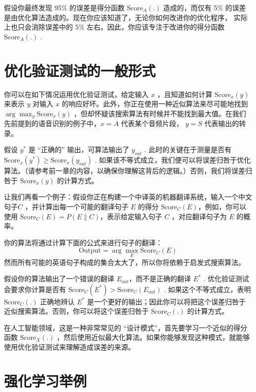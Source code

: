 假设你最终发现 95\% 的误差是得分函数 \(\text{Score}_A (.)\)
造成的，而仅有 5\%
的误差是由优化算法造成的。现在你应该知道了，无论你如何改进你的优化程序，
实际上也只会消除误差中的 5\% 左右。因此，你应该专注于改进你的得分函数
\(\text{Score}_A (.)\) .

\hypertarget{ux4f18ux5316ux9a8cux8bc1ux6d4bux8bd5ux7684ux4e00ux822cux5f62ux5f0f}{%
\chapter{优化验证测试的一般形式}\label{ux4f18ux5316ux9a8cux8bc1ux6d4bux8bd5ux7684ux4e00ux822cux5f62ux5f0f}}

你可以在如下情况运用优化验证测试，给定输入 \(x\) ，且知道如何计算
\(\text{Score}_x (y)\) 来表示 \(y\) 对输入 \(x\)
的响应好坏。此外，你正在使用一种近似算法来尽可能地找到\(\arg \max_y \text{Score}_x(y)\)
，但却怀疑该搜索算法有时候并不能找到最大值。在我们先前提到的语音识别的例子中，\(x=A\)
代表某个音频片段， \(y=S\) 代表输出的转录。

假设 \(y^*​\) 是 ``正确的'' 输出，可算法输出了 \(y_{out}​\) .
此时的关键在于测量是否有
\(\text{Score}_x(y^*) \ge \text{Score}_x(y_{out})​\) .
如果该不等式成立，我们便可以将误差归咎于优化算法。（请参考前一章的内容，以确保你理解这背后的逻辑。）否则，我们将误差归咎于
\(\text{Score}_x (y)​\) 的计算方式。

让我们再看一个例子：假设你正在构建一个中译英的机器翻译系统，输入一个中文句子\(C\)
，并计算出每一个可能的翻译句子 \(E\) 的得分
\(\text{Score}_C(E)\)，例如，你可以使用
\(\text{Score}_C(E)=P(E\|C)\)，表示给定输入句子 \(C\) ，对应翻译句子为
\(E\) 的概率。

你的算法将通过计算下面的公式来进行句子的翻译： \[
\text{Output}=\arg \max_E \text{Score}_C(E)
\]
然而所有可能的英语句子构成的集合太大了，所以你将依赖于启发式搜索算法。

假设你的算法输出了一个错误的翻译 \(E_{out}​\)，而不是正确的翻译 \(E^*​\) .
优化验证测试会要求你计算是否有
\(\text{Score}_C (E^*) \gt \text{Score}_C(E_{out}​)\) .
如果这个不等式成立，表明 \(\text{Score}_C(.)​\) 正确地辨认 \(E^*​\)
是一个更好的输出；因此你可以将把这个误差归咎于近似搜索算法。否则，你可以将这个误差归咎于
\(\text{Score}_C(.)​\) 的计算方式。

在人工智能领域，这是一种非常常见的
``设计模式''，首先要学习一个近似的得分函数 \(\text{Score}_X(.)\)
，然后使用近似最大化算法。如果你能够发现这种模式，就能够使用优化验证测试来理解造成误差的来源。

\hypertarget{ux5f3aux5316ux5b66ux4e60ux4e3eux4f8b}{%
\chapter{强化学习举例}\label{ux5f3aux5316ux5b66ux4e60ux4e3eux4f8b}}

